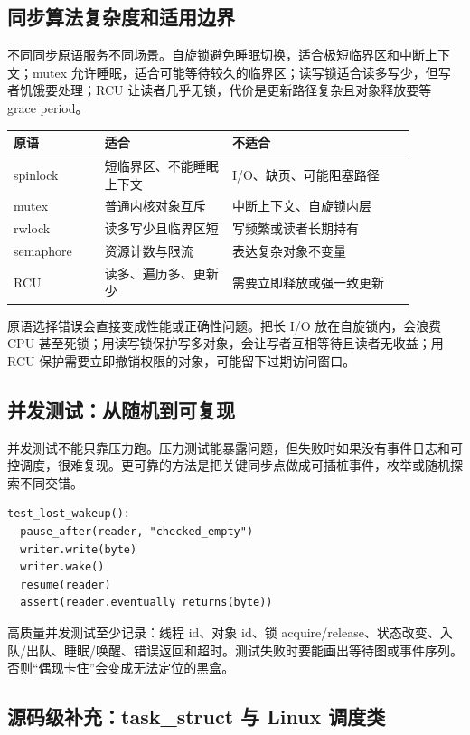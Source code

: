 \subsection{同步算法复杂度和适用边界}

不同同步原语服务不同场景。自旋锁避免睡眠切换，适合极短临界区和中断上下文；mutex 允许睡眠，适合可能等待较久的临界区；读写锁适合读多写少，但写者饥饿要处理；RCU 让读者几乎无锁，代价是更新路径复杂且对象释放要等 grace period。

\begin{longtable}{|p{0.2\linewidth}|p{0.28\linewidth}|p{0.4\linewidth}|}
\toprule
原语 & 适合 & 不适合 \\
\midrule
spinlock & 短临界区、不能睡眠上下文 & I/O、缺页、可能阻塞路径 \\\tablerowrule
mutex & 普通内核对象互斥 & 中断上下文、自旋锁内层 \\\tablerowrule
rwlock & 读多写少且临界区短 & 写频繁或读者长期持有 \\\tablerowrule
semaphore & 资源计数与限流 & 表达复杂对象不变量 \\\tablerowrule
RCU & 读多、遍历多、更新少 & 需要立即释放或强一致更新 \\
\bottomrule
\end{longtable}

原语选择错误会直接变成性能或正确性问题。把长 I/O 放在自旋锁内，会浪费 CPU 甚至死锁；用读写锁保护写多对象，会让写者互相等待且读者无收益；用 RCU 保护需要立即撤销权限的对象，可能留下过期访问窗口。

\subsection{并发测试：从随机到可复现}

并发测试不能只靠压力跑。压力测试能暴露问题，但失败时如果没有事件日志和可控调度，很难复现。更可靠的方法是把关键同步点做成可插桩事件，枚举或随机探索不同交错。

\begin{lstlisting}
test_lost_wakeup():
  pause_after(reader, "checked_empty")
  writer.write(byte)
  writer.wake()
  resume(reader)
  assert(reader.eventually_returns(byte))
\end{lstlisting}

高质量并发测试至少记录：线程 id、对象 id、锁 acquire/release、状态改变、入队/出队、睡眠/唤醒、错误返回和超时。测试失败时要能画出等待图或事件序列。否则“偶现卡住”会变成无法定位的黑盒。

\subsection{源码级补充：task\_struct 与 Linux 调度类}


